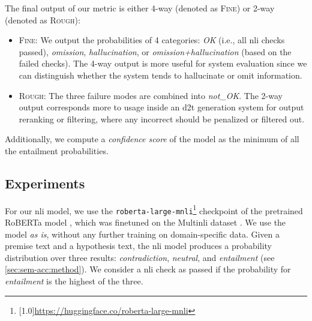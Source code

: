 The final output of our metric is either 4-way (denoted as \textsc{Fine}) or 2-way (denoted as \textsc{Rough}):
\begin{itemize}
    \item \textsc{Fine}: We output the probabilities of 4 categories: \emph{OK} (i.e., all \ac{nli} checks passed), \emph{omission}, \emph{hallucination}, or \emph{omission+hallucination} (based on the failed checks). The 4-way output is more useful for system evaluation since we can distinguish whether the system tends to hallucinate or omit information.
    \item  \textsc{Rough}: The three failure modes are combined into \emph{not\_OK}. The 2-way output corresponds more to usage inside an \ac{d2t} generation system for output reranking or filtering, where any incorrect should be penalized or filtered out.
\end{itemize}

Additionally, we compute a \textit{confidence score} of the model as the minimum of all the entailment probabilities.


\subsection{Experiments}
\label{sec:sem-acc:experiments}
For our \ac{nli} model, we use the \texttt{roberta-large-mnli}\footnote{\scalebox{0.95}[1.0]{\url{https://huggingface.co/roberta-large-mnli}}} checkpoint of the pretrained RoBERTa model \cite{liuRoBERTaRobustlyOptimized2019}, which was finetuned on the Multi\ac{nli} dataset \cite{williams2018mnli}. We use the model \textit{as is}, without any further training on domain-specific data.
Given a premise text and a hypothesis text, the \ac{nli} model produces a probability distribution over three results: \textit{contradiction}, \textit{neutral},
and \textit{entailment} (see \autoref{sec:sem-acc:method}). We consider a \ac{nli} check as passed if the probability for \textit{entailment} is the highest of the three.


